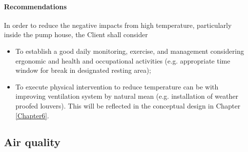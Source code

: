 \paragraph{\textbf{Recommendations}}
In order to reduce the negative impacts from high temperature, particularly inside the pump house, the Client shall consider

\begin{itemize}
\item To establish a good daily monitoring, exercise, and management considering ergonomic and health and occupational activities (e.g. appropriate time window for break in designated resting area);
\item To execute physical intervention to reduce temperature can be with improving ventilation system by natural mean (e.g. installation of weather proofed louvers). This will be reflected in the conceptual design in Chapter \ref{Chapter6}.
\end{itemize}








\subsection{Air quality}\label{ch05aq01}
